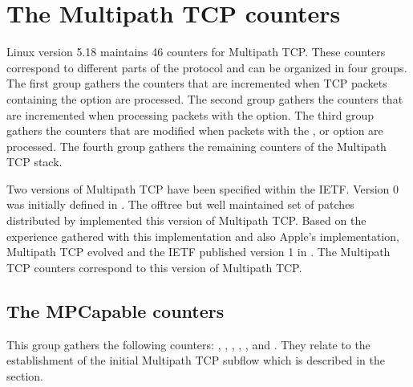 \documentclass[letterpaper,10pt,english]{sphinxmanual}
\begin{document}
\section{The Multipath TCP counters}
\label{\detokenize{mptcp-linux:the-multipath-tcp-counters}}
\sphinxAtStartPar
Linux version 5.18 maintains 46 counters for Multipath TCP. These counters
correspond to different parts of the protocol and can be organized in four
groups. The first group gathers the counters that are incremented when TCP
packets containing the  option are processed. The second group
gathers the counters that are incremented when processing packets with
the  option. The third group gathers the counters that are
modified when packets with the ,  or  option
are processed. The fourth group gathers the remaining counters of the
Multipath TCP stack.

\sphinxAtStartPar
Two versions of Multipath TCP have been specified within the IETF. Version
0 was initially defined in . The off\sphinxhyphen{}tree but well
maintained set of patches distributed by
 implemented
this version of Multipath TCP. Based on the experience gathered with this
implementation and also Apple’s implementation, Multipath TCP evolved and
the IETF published version 1 in . The Multipath TCP counters
correspond to this version of Multipath TCP.


\subsection{The MPCapable counters}
\label{\detokenize{mptcp-linux:the-mpcapable-counters}}
\sphinxAtStartPar
This group gathers the following counters: ,
, ,
, ,
 and . They
relate to the establishment of the initial Multipath TCP subflow
which is described in the {\hyperref[\detokenize{mptcp:mptcp-initial-mptcp-handshake}]{}} section.
\end{document}
